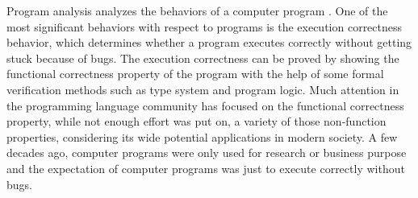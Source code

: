 Program analysis analyzes the behaviors of a computer program .
One of the most significant behaviors with respect to programs is the execution correctness behavior, which determines whether a program executes correctly without getting stuck because of bugs.
 The execution correctness can be proved  by showing the functional correctness property of the  program with the help of some formal verification methods such as type system and program logic.
 Much attention in the programming language community has focused on the functional correctness property, while not enough effort was put on, a variety of those non-function properties, considering its wide potential applications in modern society. 
 A few decades ago, computer programs were only used for research or business purpose and the expectation of computer programs was just to execute correctly without bugs. 
 


